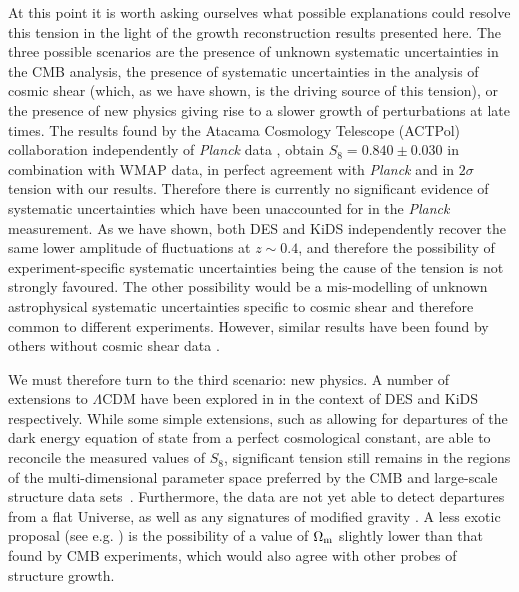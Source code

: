 \documentclass[a4paper,11pt]{article}
\newcommand{\Om}{\Omega_{\rm m}}
\newcommand{\lcdm}{$\Lambda$CDM\xspace}
\newcommand{\des}{DES\xspace}
\newcommand{\kids}{KiDS\xspace}
\newcommand{\planck}{{\sl Planck}\xspace}
\begin{document}
    At this point it is worth asking ourselves what possible explanations could resolve this tension in the light of the growth reconstruction results presented here. The three possible scenarios are the presence of unknown systematic uncertainties in the CMB analysis, the presence of systematic uncertainties in the analysis of cosmic shear (which, as we have shown, is the driving source of this tension), or the presence of new physics giving rise to a slower growth of perturbations at late times. The results found by the Atacama Cosmology Telescope (ACTPol) collaboration independently of \planck data \cite{2007.07288}, obtain $S_8=0.840\pm0.030$ in combination with WMAP data, in perfect agreement with \planck and in $2\sigma$ tension with our results. Therefore there is currently no significant evidence of systematic uncertainties which have been unaccounted for in the \planck measurement. As we have shown, both \des and \kids independently recover the same lower amplitude of fluctuations at $z\sim0.4$, and therefore the possibility of experiment-specific systematic uncertainties being the cause of the tension is not strongly favoured. The other possibility would be a mis-modelling of unknown astrophysical systematic uncertainties specific to cosmic shear and therefore common to different experiments. However, similar results have been found by others without cosmic shear data \cite{2105.03421}.

    We must therefore turn to the third scenario: new physics. A number of extensions to \lcdm have been explored in \cite{1810.02499,2010.16416} in the context of \des and \kids respectively. While some simple extensions, such as allowing for departures of the dark energy equation of state from a perfect cosmological constant, are able to reconcile the measured values of $S_8$, significant tension still remains in the regions of the multi-dimensional parameter space preferred by the CMB and large-scale structure data sets~\cite{2010.16416}. Furthermore, the data are not yet able to detect departures from a flat Universe, as well as any signatures of modified gravity \cite{2010.15278}. A less exotic proposal (see e.g. \cite{2010.00466,2103.09820,2105.03421}) is the possibility of a value of $\Om$ slightly lower than that found by CMB experiments, which would also agree with other probes of structure growth.
\end{document}
